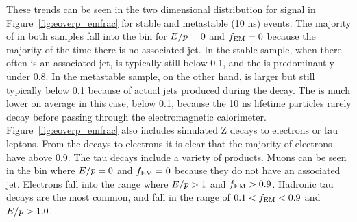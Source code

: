 These trends can be seen in the two dimensional distribution for signal in Figure~\ref{fig:eoverp_emfrac} for stable and metastable (10 ns) events.
The majority of \rhadrons in both samples fall into the bin for $E/p = 0$ and $f_\mathrm{EM} = 0$ because the majority of the time there is no associated jet. 
In the stable sample, when there often is an associated jet, \ep is typically still below 0.1, and the \emfrac is predominantly under 0.8.
In the metastable sample, on the other hand, \ep is larger but still typically below 0.1 because of actual jets produced during the decay.
The \emfrac is much lower on average in this case, below 0.1, because the 10 ns lifetime particles rarely decay before passing through the electromagnetic calorimeter.
Figure~\ref{fig:eoverp_emfrac} also includes simulated Z decays to electrons or tau leptons.
From the decays to electrons it is clear that the majority of electrons have \emfrac above 0.9.
The tau decays include a variety of products.
Muons can be seen in the bin where $E/p = 0$ and $f_\mathrm{EM} = 0$ because they do not have an associated jet.
Electrons fall into the range where $E/p > 1$ and $f_\mathrm{EM} > 0.9$.
Hadronic tau decays are the most common, and fall in the range of $0.1 < f_\mathrm{EM} < 0.9$ and $E/p > 1.0$. 

